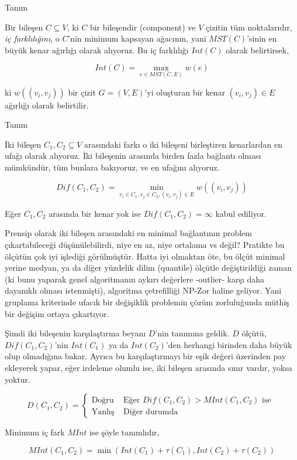\documentclass[12pt,fleqn]{article}\usepackage{../../common}
\begin{document}
Tanım

Bir bileşen $C \subseteq V$, ki $C$ bir bileşendir (component) ve $V$ çizitin tüm
noktalarıdır, {\em iç farklılığını}, o $C$'nin minimum kapsayan ağacının,
yani $MST(C)$'sinin en büyük kenar ağırlığı olarak alıyoruz. Bu iç farklılığı
$Int(C)$ olarak belirtirsek, 

$$ Int(C) = \max_{e \in MST(C,E)} w(e) $$

ki $w((v_i , v_j))$ bir çizit $G = (V,E)$'yi oluşturan bir kenar $(v_i,v_j)
\in E$ ağırlığı olarak belirtilir. 

Tanım

İki bileşen $C_1,C_2 \subseteq V$ arasındaki farkı o iki bileşeni
birleştiren kenarlardan en ufağı olarak alıyoruz. İki bileşenin arasında
birden fazla bağlantı olması mümkündür, tüm bunlara bakıyoruz, ve en
ufağını alıyoruz.

$$ Dif(C_1,C_2) = \min_{v_i \in C_1, v_j \in C_2, (v_i,v_j) \in E} w((v_i,v_j))$$

Eğer $C_1,C_2$ arasında bir kenar yok ise $Dif(C_1,C_2) = \infty$ kabul
ediliyor. 

Prensip olarak iki bileşen arasındaki en minimal bağlantının problem
çıkartabileceği düşünülebilirdi, niye en az, niye ortalama vs değil?  Pratikte
bu ölçütün çok iyi işlediği görülmüştür. Hatta iyi olmaktan öte, bu ölçüt
minimal yerine medyan, ya da diğer yüzdelik dilim (quantile) ölçütle
değiştirildiği zaman (ki bunu yaparak genel algoritmanın aykırı değerlere
-outlier- karşı daha dayanıklı olması istenmişti), algoritma çetrefilliği NP-Zor
haline geliyor. Yani gruplama kriterinde ufacık bir değişiklik problemin çözüm
zorluluğunda müthiş bir değişim ortaya çıkartıyor.

Şimdi iki bileşenin karşılaştırma beyanı $D$'nin tanımına geldik. $D$ ölçütü,
$Dif(C_1,C_2)$'nin $Int(C_1)$ ya da $Int(C_2)$'den herhangi birinden daha büyük
olup olmadığına bakar. Ayrıca bu karşılaştırmayı bir eşik değeri üzerinden pay
ekleyerek yapar, eğer irdeleme olumlu ise, iki bileşen arasında sınır vardır,
yoksa yoktur.

$$ 
D(C_1,C_2) = 
\left\{ \begin{array}{ll}
\textrm{Doğru} & \textrm{ Eğer } Dif(C_1,C_2) > MInt(C_1,C_2) \textrm{ ise } \\
\textrm{Yanlış} & \textrm{ Diğer durumda }
\end{array} \right.
 $$

Minimum iç fark $MInt$ ise şöyle tanımlıdır,

$$ 
MInt(C_1,C_2) = \min (Int(C_1)+\tau(C_1), Int(C_2)+\tau(C_2))
 $$
\end{document}
